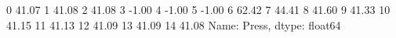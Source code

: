 0     41.07
1     41.08
2     41.08
3     -1.00
4     -1.00
5     -1.00
6     62.42
7     44.41
8     41.60
9     41.33
10    41.15
11    41.13
12    41.09
13    41.09
14    41.08
Name: Press, dtype: float64